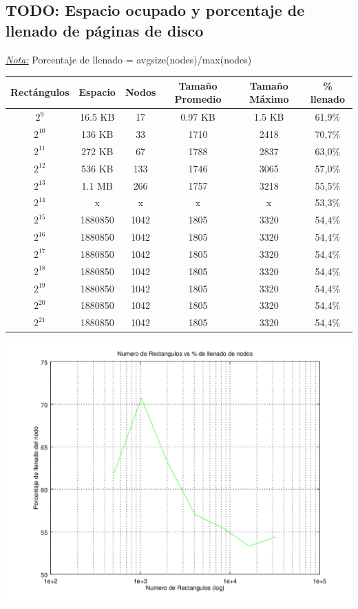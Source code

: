\documentclass[letterpaper,10pt]{article}
\begin{document}
	\subsection{TODO: Espacio ocupado y porcentaje de llenado de páginas de disco}

	\underline{\textit{Nota:}} Porcentaje de llenado = avgsize(nodes)/max(nodes)

	\begin{center}

		\begin{tabular}{|c|c|c|c|c|c|}
			\hline
			Rectángulos	& Espacio & Nodos & Tamaño Promedio & Tamaño Máximo & \% llenado\\
			\hline
			$2^{9}$ 	& 16.5 KB & 17 & 0.97 KB & 1.5 KB & 61,9\%\\
			\hline
			$2^{10}$ 	& 136 KB & 33 & 1710 & 2418 & 70,7\%\\
			\hline
			$2^{11}$ 	& 272 KB & 67 & 1788 & 2837 & 63,0\%\\
			\hline
			$2^{12}$ 	& 536 KB & 133 & 1746 & 3065 & 57,0\%\\
			\hline
			$2^{13}$ 	& 1.1 MB & 266 & 1757 & 3218 & 55,5\%\\
			\hline
			$2^{14}$ 	& x & x & x & x & 53,3\%\\
			\hline
			$2^{15}$ 	& 1880850 & 1042 & 1805 & 3320 & 54,4\%\\
			\hline
			$2^{16}$ 	& 1880850 & 1042 & 1805 & 3320 & 54,4\%\\
			\hline
			$2^{17}$ 	& 1880850 & 1042 & 1805 & 3320 & 54,4\%\\
			\hline
			$2^{18}$ 	& 1880850 & 1042 & 1805 & 3320 & 54,4\%\\
			\hline
			$2^{19}$ 	& 1880850 & 1042 & 1805 & 3320 & 54,4\%\\
			\hline
			$2^{20}$ 	& 1880850 & 1042 & 1805 & 3320 & 54,4\%\\
			\hline
			$2^{21}$ 	& 1880850 & 1042 & 1805 & 3320 & 54,4\%\\
			\hline
		\end{tabular}

		\includegraphics[width=0.75\textheight]{fig2.png}
	\end{center}
\end{document}
